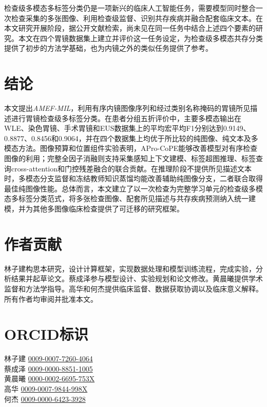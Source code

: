 \documentclass[Afour,sagev,times]{sagej}
\begin{document}
检查级多模态多标签分类仍是一项新兴的临床人工智能任务，需要模型同时整合一次检查采集的多张图像、利用检查级监督、识别共存疾病并融合配套临床文本。在本文研究开展阶段，据公开文献检索，尚未见在同一任务中结合上述四个要素的研究。本文在四个胃镜数据集上建立并评价这一任务设定，为检查级多模态共存分类提供了初步的方法学基础，也为内镜之外的类似任务提供了参考。

\section{结论}

本文提出\textit{AMEF-MIL}，利用有序内镜图像序列和经过类别名称掩码的胃镜所见描述进行胃镜检查级多标签分类。在患者分组五折评价中，主要多模态输出在WLE、染色胃镜、手术胃镜和EUS数据集上的平均宏平均F1分别达到0.9149、0.8877、0.8456和0.9064，并在四个数据集上均优于所比较的纯图像、纯文本及多模态方法。图像预算和位置组件实验表明，APro-CoPE能够改善模型对有序检查图像的利用；完整全因子消融则支持采集感知上下文建模、标签超图推理、标签查询cross-attention和门控残差融合的联合贡献。在推理阶段不提供所见描述文本时，多模态分支监督和冻结教师知识蒸馏均能改善辅助纯图像分支，二者联合取得最佳纯图像性能。总体而言，本文建立了以一次检查为完整学习单元的检查级多模态多标签分类范式，将多张检查图像、配套所见描述与共存疾病预测纳入统一建模，并为其他多图像临床检查提供了可迁移的研究框架。

\section*{作者贡献}

林子建构思本研究，设计计算框架，实现数据处理和模型训练流程，完成实验，分析结果并起草论文。蔡成泽参与模型设计、实验规划和论文修改。黄晨曦提供学术监督和方法学指导。高华和何杰提供临床监督、数据获取协调以及临床意义解释。所有作者均审阅并批准本文。

\section*{ORCID标识}
林子建 \href{https://orcid.org/0009-0007-7260-4064}{0009-0007-7260-4064}\\
蔡成泽 \href{https://orcid.org/0009-0000-8851-1005}{0009-0000-8851-1005}\\
黄晨曦 \href{https://orcid.org/0000-0002-6695-753X}{0000-0002-6695-753X}\\
高华 \href{https://orcid.org/0009-0007-9844-998X}{0009-0007-9844-998X}\\
何杰 \href{https://orcid.org/0009-0000-6423-3928}{0009-0000-6423-3928}
\end{document}
